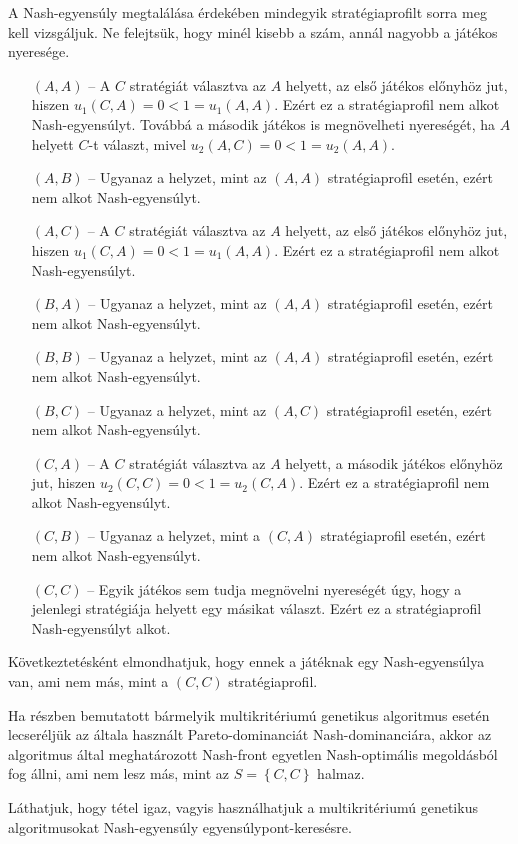 \begin{pld}
  A Nash-egyensúly megtalálása érdekében mindegyik stratégiaprofilt sorra meg kell vizsgáljuk.
  Ne felejtsük, hogy minél kisebb a szám, annál nagyobb a játékos nyeresége.
  \begin{itemize}
    \item[$(A, A)$] -- A $C$ stratégiát választva az $A$ helyett, az első játékos előnyhöz jut, hiszen $u_1(C, A) = 0 < 1 = u_1(A, A)$.
          Ezért ez a stratégiaprofil nem alkot Nash-egyensúlyt.
          Továbbá a második játékos is megnövelheti nyereségét, ha $A$ helyett $C$-t választ, mivel $u_2(A, C) = 0 < 1 = u_2(A, A)$.
    \item[$(A, B)$] -- Ugyanaz a helyzet, mint az $(A, A)$ stratégiaprofil esetén, ezért nem alkot Nash-egyensúlyt.
    \item[$(A, C)$] -- A $C$ stratégiát választva az $A$ helyett, az első játékos előnyhöz jut, hiszen $u_1(C, A) = 0 < 1 = u_1(A, A)$.
          Ezért ez a stratégiaprofil nem alkot Nash-egyensúlyt.
    \item[$(B, A)$] -- Ugyanaz a helyzet, mint az $(A, A)$ stratégiaprofil esetén, ezért nem alkot Nash-egyensúlyt.
    \item[$(B, B)$] -- Ugyanaz a helyzet, mint az $(A, A)$ stratégiaprofil esetén, ezért nem alkot Nash-egyensúlyt.
    \item[$(B, C)$] -- Ugyanaz a helyzet, mint az $(A, C)$ stratégiaprofil esetén, ezért nem alkot Nash-egyensúlyt.
    \item[$(C, A)$] -- A $C$ stratégiát választva az $A$ helyett, a második játékos előnyhöz jut, hiszen $u_2(C, C) = 0 < 1 = u_2(C, A)$.
          Ezért ez a stratégiaprofil nem alkot Nash-egyensúlyt.
    \item[$(C, B)$] -- Ugyanaz a helyzet, mint a $(C, A)$ stratégiaprofil esetén, ezért nem alkot Nash-egyensúlyt.
    \item[$(C, C)$] -- Egyik játékos sem tudja megnövelni nyereségét úgy, hogy a jelenlegi stratégiája helyett egy másikat választ.
          Ezért ez a stratégiaprofil Nash-egyensúlyt alkot.
  \end{itemize}

  Következtetésként elmondhatjuk, hogy ennek a játéknak egy Nash-egyensúlya van, ami nem más, mint a $(C, C)$ stratégiaprofil.

  Ha  részben bemutatott bármelyik multikritériumú genetikus algoritmus esetén lecseréljük az általa használt Pareto-dominanciát Nash-dominanciára,
  akkor az algoritmus által meghatározott Nash-front egyetlen Nash-optimális megoldásból fog állni, ami nem lesz más, mint az $S = \left\{ C, C \right\}$ halmaz.

  Láthatjuk, hogy  tétel igaz, vagyis használhatjuk a multikritériumú genetikus algoritmusokat Nash-egyensúly egyensúlypont-keresésre.
\end{pld}

